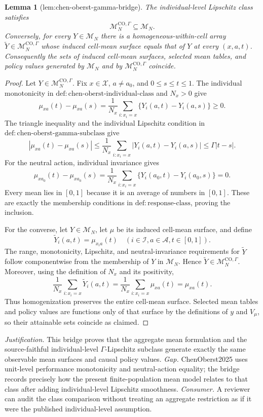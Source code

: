 \documentclass{article}
\newtheorem{lemma}{Lemma}
\begin{document}
\begin{lemma}[lem:chen-oberst-gamma-bridge]\label{lem:chen-oberst-gamma-bridge}
The individual-level Lipschitz class satisfies
\[
\mathcal M_N^{\mathrm{CO},\Gamma}\subseteq\mathcal M_N.
\]
Conversely, for every \(Y\in\mathcal M_N\) there is a homogeneous-within-cell array \(\widetilde Y\in\mathcal M_N^{\mathrm{CO},\Gamma}\) whose induced cell-mean surface equals that of \(Y\) at every \((x,a,t)\).  Consequently the sets of induced cell-mean surfaces, selected mean tables, and policy values generated by \(\mathcal M_N\) and by \(\mathcal M_N^{\mathrm{CO},\Gamma}\) coincide.
\end{lemma}
\begin{proof}
Let \(Y\in\mathcal M_N^{\mathrm{CO},\Gamma}\).  Fix \(x\in\mathcal X\), \(a\neq a_0\), and \(0\leq s\leq t\leq1\).  The individual monotonicity in \(\mathrm{def{:}chen\text{-}oberst\text{-}individual\text{-}class}\) and \(N_x>0\) give
\[
\mu_{xa}(t)-\mu_{xa}(s)
=\frac1{N_x}\sum_{i:x_i=x}\{Y_i(a,t)-Y_i(a,s)\}\geq0.
\]
The triangle inequality and the individual Lipschitz condition in \(\mathrm{def{:}chen\text{-}oberst\text{-}gamma\text{-}subclass}\) give
\[
|\mu_{xa}(t)-\mu_{xa}(s)|
\leq\frac1{N_x}\sum_{i:x_i=x}|Y_i(a,t)-Y_i(a,s)|
\leq\Gamma|t-s|.
\]
For the neutral action, individual invariance gives
\[
\mu_{x a_0}(t)-\mu_{x a_0}(s)
=\frac1{N_x}\sum_{i:x_i=x}\{Y_i(a_0,t)-Y_i(a_0,s)\}=0.
\]
Every mean lies in \([0,1]\) because it is an average of numbers in \([0,1]\).  These are exactly the membership conditions in \(\mathrm{def{:}response\text{-}class}\), proving the inclusion.

For the converse, let \(Y\in\mathcal M_N\), let \(\mu\) be its induced cell-mean surface, and define
\[
\widetilde Y_i(a,t)=\mu_{x_i a}(t)
\quad(i\in\mathcal I, a\in\mathcal A, t\in[0,1]).
\]
The range, monotonicity, Lipschitz, and neutral-invariance requirements for \(\widetilde Y\) follow componentwise from the membership of \(Y\) in \(\mathcal M_N\).  Hence \(\widetilde Y\in\mathcal M_N^{\mathrm{CO},\Gamma}\).  Moreover, using the definition of \(N_x\) and its positivity,
\[
\frac1{N_x}\sum_{i:x_i=x}\widetilde Y_i(a,t)
=\frac1{N_x}\sum_{i:x_i=x}\mu_{xa}(t)
=\mu_{xa}(t).
\]
Thus homogenization preserves the entire cell-mean surface.  Selected mean tables and policy values are functions only of that surface by the definitions of \(y\) and \(V_\mu\), so their attainable sets coincide as claimed.
\end{proof}
\par\smallskip\noindent \textit{Justification.} This bridge proves that the aggregate mean formulation and the source-faithful individual-level \(\Gamma\)-Lipschitz subclass generate exactly the same observable mean surfaces and causal policy values. \textit{Gap.} ChenOberst2025 uses unit-level performance monotonicity and neutral-action equality; the bridge records precisely how the present finite-population mean model relates to that class after adding individual-level Lipschitz smoothness. \textit{Consumer.} A reviewer can audit the class comparison without treating an aggregate restriction as if it were the published individual-level assumption.
\end{document}
